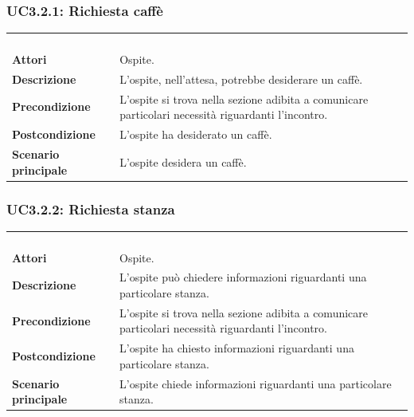 \newpage\subsubsection{UC3.2.1: Richiesta caffè}
\label{UC3.2.1}
\begin{longtable}{l|p{10cm}}
\rowcolor[gray]{0.8} \multicolumn{2}{c}{} \\
\rowcolor[gray]{0.8} \multicolumn{2}{c}{\textbf{UC3.2.1 - Richiesta caffè}} \\
\rowcolor[gray]{0.8} \multicolumn{2}{c}{} \\
\hline
&\\
\textbf{Attori} & Ospite.\\[7pt]
\textbf{Descrizione} & L'ospite, nell'attesa, potrebbe desiderare un caffè.\\[7pt]
\textbf{Precondizione} & L'ospite si trova nella sezione adibita a comunicare particolari necessità riguardanti l'incontro.\\[7pt]
\textbf{Postcondizione} & L'ospite ha desiderato un caffè.\\[7pt]
\textbf{Scenario principale} &L'ospite desidera un caffè.\\[7pt]\hline
\end{longtable}

\subsubsection{UC3.2.2: Richiesta stanza}
\label{UC3.2.2}
\begin{longtable}{l|p{10cm}}
\rowcolor[gray]{0.8} \multicolumn{2}{c}{} \\
\rowcolor[gray]{0.8} \multicolumn{2}{c}{\textbf{UC3.2.2 - Richiesta stanza}} \\
\rowcolor[gray]{0.8} \multicolumn{2}{c}{} \\
\hline
&\\
\textbf{Attori} & Ospite.\\[7pt]
\textbf{Descrizione} & L'ospite può chiedere informazioni riguardanti una particolare stanza.\\[7pt]
\textbf{Precondizione} & L'ospite si trova nella sezione adibita a comunicare particolari necessità riguardanti l'incontro.\\[7pt]
\textbf{Postcondizione} & L'ospite ha chiesto informazioni riguardanti una particolare stanza.\\[7pt]
\textbf{Scenario principale} &L'ospite chiede informazioni riguardanti una particolare stanza.\\[7pt]\hline
\end{longtable}

